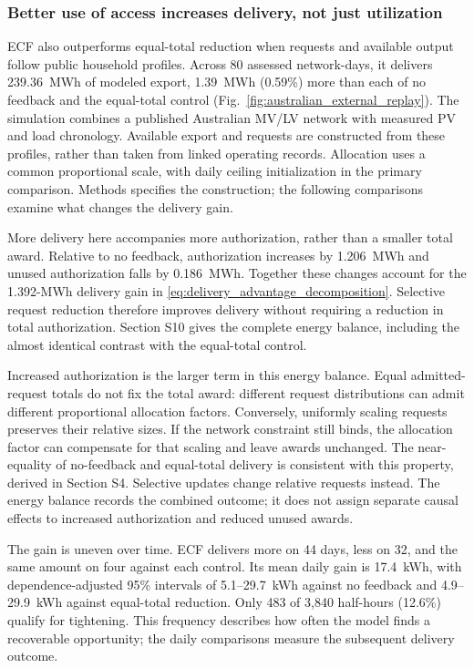 \documentclass[twoside,twocolumn,9pt]{article}
\begin{document}
\subsubsection{Better use of access increases delivery, not just utilization}

ECF also outperforms equal-total reduction when requests and available output
follow public household profiles. Across 80 assessed network-days, it delivers
239.36~MWh of modeled export, 1.39~MWh (0.59\%) more than each of no feedback
and the equal-total control (Fig.~\ref{fig:australian_external_replay}).
The simulation combines a published Australian MV/LV network with measured
PV and load chronology. Available export and requests are constructed from
these profiles, rather than taken from linked operating records. Allocation
uses a common proportional scale, with daily ceiling initialization in the
primary comparison. Methods specifies the construction; the following
comparisons examine what changes the delivery gain.

More delivery here accompanies more authorization, rather than a smaller total
award. Relative to no feedback, authorization increases by 1.206~MWh and
unused authorization falls by 0.186~MWh. Together these changes account for
the 1.392-MWh delivery gain in
\eqref{eq:delivery_advantage_decomposition}. Selective request reduction
therefore improves delivery without requiring a reduction in total
authorization. Section S10 gives the complete energy balance, including the
almost identical contrast with the equal-total control.

Increased authorization is the larger term in this energy balance. Equal
admitted-request totals do not fix the total award: different request
distributions can admit different proportional allocation factors. Conversely,
uniformly scaling requests preserves their relative sizes. If the network
constraint still binds, the allocation factor can compensate for that scaling
and leave awards unchanged. The near-equality of no-feedback and equal-total
delivery is consistent with this property, derived in Section S4. Selective
updates change relative requests instead. The energy balance records the
combined outcome; it does not assign separate causal effects to increased
authorization and reduced unused awards.

The gain is uneven over time. ECF delivers more on 44 days, less on 32,
and the same amount on four against each control. Its mean daily gain is
17.4~kWh, with dependence-adjusted 95\% intervals of 5.1--29.7~kWh against
no feedback and 4.9--29.9~kWh against equal-total reduction. Only 483 of
3,840 half-hours (12.6\%) qualify for tightening. This frequency describes
how often the model finds a recoverable opportunity; the daily comparisons
measure the subsequent delivery outcome.
\end{document}
